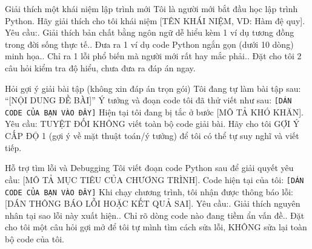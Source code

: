 \documentclass[11pt,a4paper]{article}
\begin{document}
\begin{promptbox}{Giải thích một khái niệm lập trình mới}
\small
Tôi là người mới bắt đầu học lập trình Python. Hãy giải thích cho tôi khái niệm [TÊN KHÁI NIỆM, VD: Hàm đệ quy].\newline
Yêu cầu:. Giải thích bản chất bằng ngôn ngữ dễ hiểu kèm 1 ví dụ tương đồng trong đời sống thực tế.. Đưa ra 1 ví dụ code Python ngắn gọn (dưới 10 dòng) minh họa.. Chỉ ra 1 lỗi phổ biến mà người mới rất hay mắc phải.. Đặt cho tôi 2 câu hỏi kiểm tra độ hiểu, chưa đưa ra đáp án ngay.
\end{promptbox}

\begin{promptbox}{Hỏi gợi ý giải bài tập (không xin đáp án trọn gói)}
\small
Tôi đang tự làm bài tập sau: ``[NỘI DUNG ĐỀ BÀI]''\newline
Ý tưởng và đoạn code tôi đã thử viết như sau:\newline
\texttt{[DÁN CODE CỦA BẠN VÀO ĐÂY]}\newline
Hiện tại tôi đang bị tắc ở bước [MÔ TẢ KHÓ KHĂN].\newline
Yêu cầu: TUYỆT ĐỐI KHÔNG viết toàn bộ code giải bài. Hãy cho tôi GỢI Ý CẤP ĐỘ 1 (gợi ý về mặt thuật toán/ý tưởng) để tôi có thể tự suy nghĩ và viết tiếp.
\end{promptbox}

\begin{promptbox}{Hỗ trợ tìm lỗi và Debugging}
\small
Tôi viết đoạn code Python sau để giải quyết yêu cầu: [MÔ TẢ MỤC TIÊU CỦA CHƯƠNG TRÌNH].\newline
Code hiện tại của tôi:\newline
\texttt{[DÁN CODE CỦA BẠN VÀO ĐÂY]}\newline
Khi chạy chương trình, tôi nhận được thông báo lỗi: [DÁN THÔNG BÁO LỖI HOẶC KẾT QUẢ SAI].\newline
Yêu cầu:. Giải thích nguyên nhân tại sao lỗi này xuất hiện.. Chỉ rõ dòng code nào đang tiềm ẩn vấn đề.. Đặt cho tôi một câu hỏi gợi mở để tôi tự mình tìm cách sửa lỗi, KHÔNG sửa lại toàn bộ code của tôi.
\end{promptbox}
\end{document}
